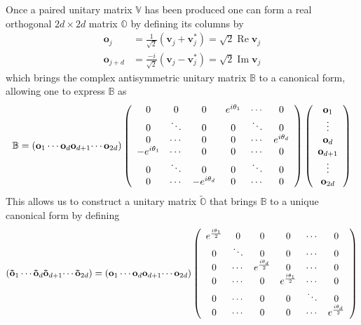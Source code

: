 \documentclass[aps,preprint]{revtex4}%
\begin{document}
Once a paired unitary matrix $\mathbb{V}$ has been produced one can form a
real orthogonal $2d\times2d$ matrix $\mathbb{O}$ by defining its columns by
\begin{align}
\mathbf{o}_{j} &  =\frac{1}{\sqrt{2}}\left(  \mathbf{v}_{j}+\mathbf{v}%
_{j}^{\ast}\right)  =\sqrt{2}\operatorname{Re}\mathbf{v}_{j}\nonumber\\
\mathbf{o}_{j+d} &  =\frac{-i}{\sqrt{2}}\left(  \mathbf{v}_{j}-\mathbf{v}%
_{j}^{\ast}\right)  =\sqrt{2}\operatorname{Im}\mathbf{v}_{j}%
\end{align}
which brings the complex antisymmetric unitary matrix $\mathbb{B}$ to a
canonical form, allowing one to express $\mathbb{B}$ as
\begin{equation}
\mathbb{B}=\left(  \mathbf{o}_{1}\cdots\mathbf{o}_{d}\mathbf{o}_{d+1}%
\mathbf{\cdots o}_{2d}\right)  \left(
\begin{array}
[c]{cccccc}%
0 & 0 & 0 & e^{i\theta_{1}} & \cdots & 0\\
0 & \ddots & 0 & 0 & \ddots & 0\\
0 & \cdots & 0 & 0 & \cdots & e^{i\theta_{d}}\\
-e^{i\theta_{1}} & \cdots & 0 & 0 & \cdots & 0\\
0 & \ddots & 0 & 0 & \ddots & 0\\
0 & \cdots & -e^{i\theta_{d}} & 0 & \cdots & 0
\end{array}
\right)  \left(
\begin{array}
[c]{c}%
\mathbf{o}_{1}\\
\vdots\\
\mathbf{o}_{d}\\
\mathbf{o}_{d+1}\\
\vdots\\
\mathbf{o}_{2d}%
\end{array}
\right)  \label{reex1}%
\end{equation}
This allows us to construct a unitary matrix $\widetilde{\mathbb{O}}$ that
brings $\mathbb{B}$ to a unique canonical form by defining
\begin{equation}
\left(  \mathbf{\tilde{o}}_{1}\cdots\mathbf{\tilde{o}}_{d}\mathbf{\tilde{o}%
}_{d+1}\mathbf{\cdots\tilde{o}}_{2d}\right)  =\left(  \mathbf{o}_{1}%
\cdots\mathbf{o}_{d}\mathbf{o}_{d+1}\mathbf{\cdots o}_{2d}\right)  \left(
\begin{array}
[c]{cccccc}%
e^{\frac{i\theta_{1}}{2}} & 0 & 0 & 0 & \cdots & 0\\
0 & \ddots & 0 & 0 & \cdots & 0\\
0 & \cdots & e^{\frac{i\theta_{d}}{2}} & 0 & \cdots & 0\\
0 & \cdots & 0 & e^{\frac{i\theta_{1}}{2}} & \cdots & 0\\
0 & \cdots & 0 & 0 & \ddots & 0\\
0 & \cdots & 0 & 0 & \cdots & e^{\frac{i\theta_{d}}{2}}%
\end{array}
\right)
\end{equation}
\end{document}
